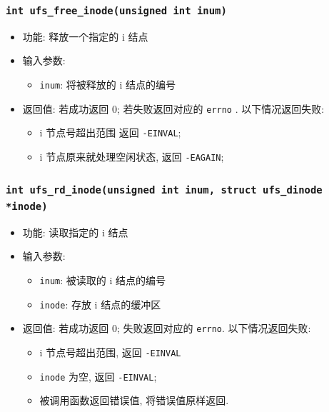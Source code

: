 \documentclass[nofonts, titlepage]{ctexart}
\begin{document}
  \subsubsection[\texttt{ufs\_free\_inode}]{\texttt{int ufs\_free\_inode(unsigned int inum)}}
  \begin{itemize}
\item
  功能: 释放一个指定的 i 结点
\item
  输入参数:

  \begin{itemize}
  \item
    \texttt{inum}: 将被释放的 i 结点的编号
  \end{itemize}
\item
  返回值: 若成功返回 0; 若失败返回对应的 \texttt{errno} .
  以下情况返回失败:

  \begin{itemize}
  \item
    i 节点号超出范围 返回 \texttt{-EINVAL};
  \item
    i 节点原来就处理空闲状态, 返回 \texttt{-EAGAIN};
  \end{itemize}
\end{itemize}
\subsubsection[\texttt{ufs\_rd\_inode}]{\texttt{int ufs\_rd\_inode(unsigned int inum, struct ufs\_dinode *inode)}}
\begin{itemize}
\item
  功能: 读取指定的 i 结点
\item
  输入参数:

  \begin{itemize}
  \item
    \texttt{inum}: 被读取的 i 结点的编号
  \item
    \texttt{inode}: 存放 i 结点的缓冲区
  \end{itemize}
\item
  返回值: 若成功返回 0; 失败返回对应的 \texttt{errno}. 以下情况返回失败:

  \begin{itemize}
  \item
    i 节点号超出范围, 返回 \texttt{-EINVAL}
  \item
    \texttt{inode} 为空, 返回 \texttt{-EINVAL};
  \item
    被调用函数返回错误值, 将错误值原样返回.
  \end{itemize}
  \end{itemize}
\end{document}
